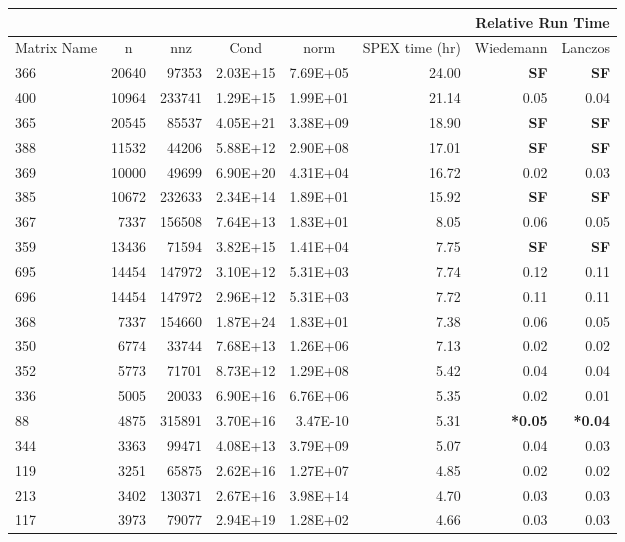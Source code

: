 \documentclass[10pt]{article}
\newcommand{\red}{
	\color{red}	
	}
\begin{document}
\begin{longtable}{|l|r|r|r|r|r|r|r|}
\hline	
& & & & & & \multicolumn{2}{c|}{Relative Run Time}  \\ \hline
\multicolumn{1}{|c|}{Matrix Name}	& \multicolumn{1}{c|}{n} & \multicolumn{1}{c|}{nnz} & \multicolumn{1}{c|}{Cond} & \multicolumn{1}{c|}{norm} & \multicolumn{1}{c|}{SPEX time (hr)} & \multicolumn{1}{c|}{Wiedemann} & \multicolumn{1}{c|}{Lanczos}  \\  \hline \endhead
366	&	20640	&	97353	&	2.03E+15	&	7.69E+05	&	24.00	&	{\bf \red SF}	&	{\bf \red SF}	\\
400	&	10964	&	233741	&	1.29E+15	&	1.99E+01	&	21.14	&	0.05	&	0.04	\\
365	&	20545	&	85537	&	4.05E+21	&	3.38E+09	&	18.90	&	{\bf \red SF}	&	{\bf \red SF}	\\
388	&	11532	&	44206	&	5.88E+12	&	2.90E+08	&	17.01	&	{\bf \red SF}	&	{\bf \red SF}	\\
369	&	10000	&	49699	&	6.90E+20	&	4.31E+04	&	16.72	&	0.02	&	0.03	\\
385	&	10672	&	232633	&	2.34E+14	&	1.89E+01	&	15.92	&	{\bf \red SF}	&	{\bf \red SF}	\\
367	&	7337	&	156508	&	7.64E+13	&	1.83E+01	&	8.05	&	0.06	&	0.05	\\
359	&	13436	&	71594	&	3.82E+15	&	1.41E+04	&	7.75	&	{\bf \red SF}	&	{\bf \red SF}	\\
695	&	14454	&	147972	&	3.10E+12	&	5.31E+03	&	7.74	&	0.12	&	0.11	\\
696	&	14454	&	147972	&	2.96E+12	&	5.31E+03	&	7.72	&	0.11	&	0.11	\\
368	&	7337	&	154660	&	1.87E+24	&	1.83E+01	&	7.38	&	0.06	&	0.05	\\
350	&	6774	&	33744	&	7.68E+13	&	1.26E+06	&	7.13	&	0.02	&	0.02	\\
352	&	5773	&	71701	&	8.73E+12	&	1.29E+08	&	5.42	&	0.04	&	0.04	\\
336	&	5005	&	20033	&	6.90E+16	&	6.76E+06	&	5.35	&	0.02	&	0.01	\\
88	&	4875	&	315891	&	3.70E+16	&	3.47E-10	&	5.31	&	{\bf \red *0.05}	&	{\bf \red *0.04}	\\
344	&	3363	&	99471	&	4.08E+13	&	3.79E+09	&	5.07	&	0.04	&	0.03	\\
119	&	3251	&	65875	&	2.62E+16	&	1.27E+07	&	4.85	&	0.02	&	0.02	\\
213	&	3402	&	130371	&	2.67E+16	&	3.98E+14	&	4.70	&	0.03	&	0.03	\\
117	&	3973	&	79077	&	2.94E+19	&	1.28E+02	&	4.66	&	0.03	&	0.03	\\

\end{longtable}
\end{document}
